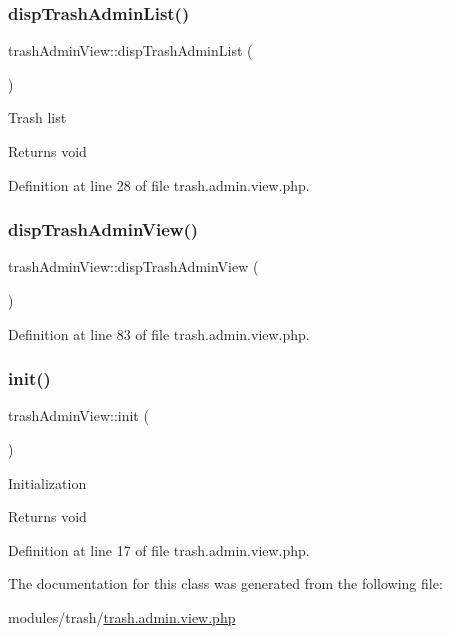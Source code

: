 \subsubsection{\texorpdfstring{disp\+Trash\+Admin\+List()}{dispTrashAdminList()}}
{\footnotesize\ttfamily trash\+Admin\+View\+::disp\+Trash\+Admin\+List (\begin{DoxyParamCaption}{ }\end{DoxyParamCaption})}

Trash list \begin{DoxyReturn}{Returns}
void 
\end{DoxyReturn}


Definition at line 28 of file trash.\+admin.\+view.\+php.

\hypertarget{classtrashAdminView_a77a13f0633df48ee6802c706d8ccf1de}{}\label{classtrashAdminView_a77a13f0633df48ee6802c706d8ccf1de} 
\subsubsection{\texorpdfstring{disp\+Trash\+Admin\+View()}{dispTrashAdminView()}}
{\footnotesize\ttfamily trash\+Admin\+View\+::disp\+Trash\+Admin\+View (\begin{DoxyParamCaption}{ }\end{DoxyParamCaption})}



Definition at line 83 of file trash.\+admin.\+view.\+php.

\hypertarget{classtrashAdminView_a471722f4a946b3eff0992c48f268d7eb}{}\label{classtrashAdminView_a471722f4a946b3eff0992c48f268d7eb} 
\subsubsection{\texorpdfstring{init()}{init()}}
{\footnotesize\ttfamily trash\+Admin\+View\+::init (\begin{DoxyParamCaption}{ }\end{DoxyParamCaption})}

Initialization \begin{DoxyReturn}{Returns}
void 
\end{DoxyReturn}


Definition at line 17 of file trash.\+admin.\+view.\+php.



The documentation for this class was generated from the following file\+:\begin{DoxyCompactItemize}
\item 
modules/trash/\hyperlink{trash_8admin_8view_8php}{trash.\+admin.\+view.\+php}\end{DoxyCompactItemize}
